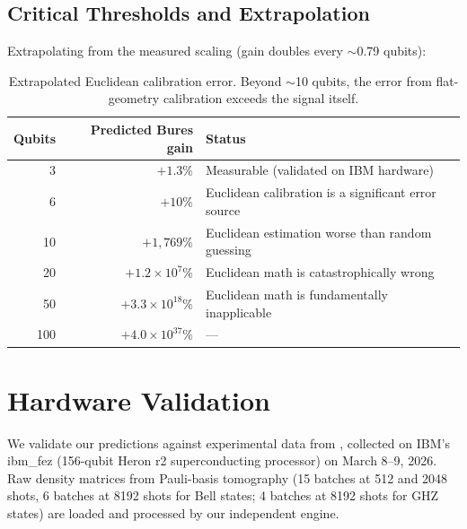 \documentclass[12pt,a4paper]{article}
\begin{document}
\subsection{Critical Thresholds and Extrapolation}

Extrapolating from the measured scaling (gain doubles every $\sim$0.79 qubits):

\begin{table}[H]
\centering
\begin{tabular}{rrl}
\toprule
Qubits & Predicted Bures gain & Status \\
\midrule
3 & $+1.3\%$ & Measurable (validated on IBM hardware) \\
6 & $+10\%$ & Euclidean calibration is a significant error source \\
10 & $+1{,}769\%$ & Euclidean estimation worse than random guessing \\
20 & $+1.2 \times 10^7\%$ & Euclidean math is catastrophically wrong \\
50 & $+3.3 \times 10^{18}\%$ & Euclidean math is fundamentally inapplicable \\
100 & $+4.0 \times 10^{37}\%$ & --- \\
\bottomrule
\end{tabular}
\caption{Extrapolated Euclidean calibration error. Beyond $\sim$10 qubits, the error from flat-geometry calibration exceeds the signal itself.}
\label{tab:extrapolation}
\end{table}

\section{Hardware Validation}
\label{sec:hardware}

We validate our predictions against experimental data from \cite{muir2026}, collected on IBM's ibm\_fez (156-qubit Heron r2 superconducting processor) on March 8--9, 2026. Raw density matrices from Pauli-basis tomography (15 batches at 512 and 2048 shots, 6 batches at 8192 shots for Bell states; 4 batches at 8192 shots for GHZ states) are loaded and processed by our independent engine.
\end{document}

